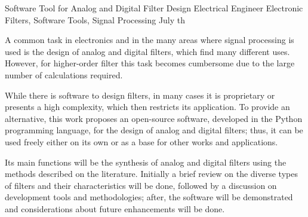 \documentclass[tcc]{mdtufsm}
\begin{document}
\begin{englishabstract}
{Software Tool for Analog and Digital Filter Design}
{Electrical Engineer}
{Electronic Filters, Software Tools, Signal Processing}
{July}
{th}

A common task in electronics and in the many areas where signal processing is used is the design of analog and  digital filters, which find many different uses. However, for higher-order filter this task becomes cumbersome due to the large number of calculations required.

While there is software to design filters, in many cases it is proprietary or presents a high complexity, which then restricts its application. To provide an alternative, this work proposes an open-source software, developed in the Python programming language, for the design of analog and digital filters; thus, it can be used freely either on its own or as a base for other works and applications.

Its main functions will be the synthesis of analog and digital filters using the methods described on the literature. Initially a brief review on the diverse types of filters and their characteristics will be done, followed by a discussion on development tools and methodologies; after, the software will be demonstrated and considerations about future enhancements will be done.
\end{englishabstract}


\listoffigures

\listoftables

\end{document}
